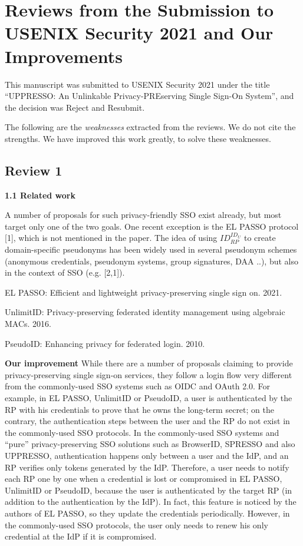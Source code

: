 \documentclass[letterpaper,onecolumn,10pt]{article}
\begin{document}
\section*{Reviews from the Submission to USENIX Security 2021 and Our Improvements}

This manuscript was submitted to USENIX Security 2021 under the title ``UPPRESSO: An Unlinkable Privacy-PREserving Single Sign-On System'',
     and the decision was Reject and Resubmit.

The following are the \emph{weaknesses} extracted from the reviews. We do not cite the strengths.
We have improved this work greatly, to solve these weaknesses.

\subsection*{Review 1}
\noindent\textbf{1.1 Related work}

A number of proposals for such privacy-friendly SSO exist already, but most target only one of the two goals.
One recent exception is the EL PASSO protocol [1], which is not mentioned in the paper.
The idea of using $ID_{RP}^{ID_U}$ to create domain-specific pseudonyms has been widely used in several pseudonym schemes (anonymous credentials, pseudonym systems, group signatures, DAA ..),
     but also in the context of SSO (e.g. [2,1]).

\noindent[1] EL PASSO: Efficient and lightweight privacy-preserving single sign on. 2021.

\noindent[2] UnlimitID: Privacy-preserving federated identity management using algebraic MACs. 2016.

\noindent[3] PseudoID: Enhancing privacy for federated login. 2010.


\vspace{1mm}\noindent\textbf{Our improvement}
While there are a number of proposals claiming to provide privacy-preserving single sign-on services,
    they follow a login flow very different from the commonly-used SSO systems such as OIDC and OAuth 2.0.
For example, in EL PASSO, UnlimitID or PseudoID,
    a user is authenticated by the RP with his credentials
            to prove that he owns the long-term secret;
            on the contrary,
    the authentication steps between the user and the RP do not exist in the commonly-used SSO protocols.
In the commonly-used SSO systems and ``pure'' privacy-preserving SSO solutions
    such as BrowserID, SPRESSO and also UPPRESSO,
    authentication happens only between a user and the IdP,
    and an RP verifies only tokens generated by the IdP.
Therefore,
        a user needs to notify each RP one by one when a credential is lost or compromised in EL PASSO, UnlimitID or PseudoID,
    because the user is authenticated by the target RP (in addition to the authentication by the IdP).
In fact, this feature is noticed by the authors of EL PASSO,
    so they update the credentials periodically.
However, in the commonly-used SSO protocols, the user only needs to renew his only credential at the IdP if it is compromised.
\end{document}
